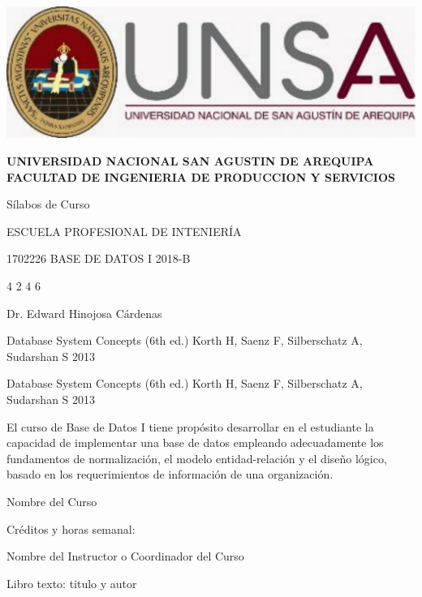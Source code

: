 \documentclass[12pt]{article}
\begin{document}
\begin{minipage}[c]{0.33\linewidth}
    \includegraphics[scale=0.13]{images/image001.png}
\end{minipage} 
\begin{minipage}[c]{0.75\linewidth}
\begin{center}

\textbf{UNIVERSIDAD NACIONAL SAN AGUSTIN DE AREQUIPA
FACULTAD DE INGENIERIA DE PRODUCCION Y SERVICIOS}
\end{center}

\end{minipage}


Sílabos de Curso

ESCUELA PROFESIONAL DE INTENIERÍA

\curso
{1702226} %
{BASE DE DATOS I} %
{2018-B} %

\creditosHoras
{4} %
{2} %
{} %
{} %
{4} %
{6} %

\instructor
{Dr. Edward Hinojosa Cárdenas}

\libro
{Database System Concepts (6th ed.)} %
{Korth H, Saenz F, Silberschatz A, Sudarshan S} %
{2013} %

\libroSecundario
{Database System Concepts (6th ed.)} %
{Korth H, Saenz F, Silberschatz A, Sudarshan S} %
{2013} %

\begin{datosCurso}
    \begin{descripcion}
        El curso de Base de Datos I tiene propósito desarrollar en el estudiante la capacidad de implementar una base de datos empleando adecuadamente los fundamentos de normalización, el modelo entidad-relación y el diseño lógico, basado en los requerimientos de información de una organización.
    \end{descripcion}
\end{datosCurso}

Nombre del Curso

Créditos y horas semanal:

Nombre del Instructor o Coordinador del Curso

Libro texto: titulo y autor
\end{document}
